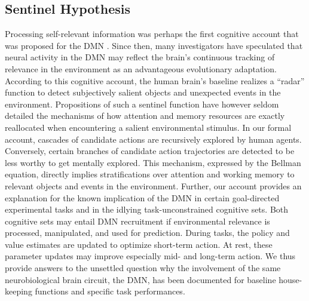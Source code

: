 \documentclass[10pt,letterpaper]{article}
\begin{document}
\subsection{Sentinel Hypothesis}
Processing self-relevant information was perhaps the first
cognitive account that was proposed for the DMN \citep{gusnard2001medial}.
Since then,
many investigators have speculated that neural activity in the DMN
may reflect the brain's continuous tracking of
relevance in the environment
as an advantageous evolutionary adaptation.
According to this cognitive account, the human brain's baseline realizes
a ``radar'' function to
detect subjectively salient objects and unexpected events in the environment.
Propositions of such a sentinel function have however seldom detailed
the mechanisms of
how attention and memory resources are exactly reallocated when
encountering a salient environmental stimulus.
In our formal account,
cascades of candidate actions
are recursively explored by human agents. Conversely,
certain branches of candidate action trajectories
are detected to be less worthy to get mentally explored.
This mechanism, expressed by the Bellman equation,
directly implies stratifications over attention and working memory
to relevant objects and events in the environment.
%
Further,
our account provides an explanation for the known implication
of the DMN
in certain goal-directed experimental tasks and
in the idlying task-unconstrained cognitive sets.
Both cognitive sets may entail DMN recruitment
if environmental relevance is processed, manipulated, and used for prediction.
During tasks,
the policy and value estimates are updated to optimize short-term action.
At rest, these parameter updates may
improve especially mid- and long-term action.
We thus provide answers to the unsettled question why the involvement
of the same neurobiological brain circuit, the DMN, has been documented
for baseline house-keeping functions and specific task performances.
\end{document}
